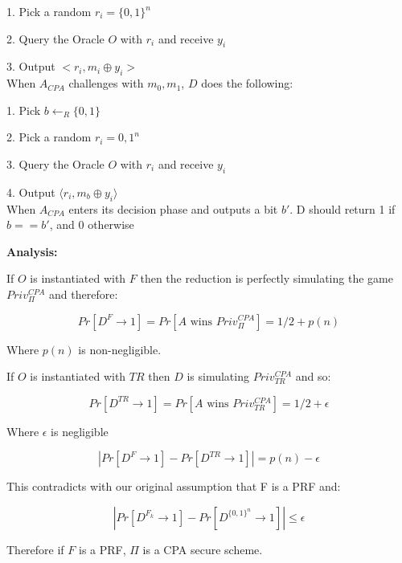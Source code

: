 \documentclass[11pt]{article}
\begin{document}
	\hspace{\parindent} 1. Pick a random $r_i = \{0,1\}^n$
	
	\hspace{\parindent} 2. Query the Oracle $O$ with $r_i$ and receive $y_i$
		
	\hspace{\parindent} 3. Output $<r_i, m_i \oplus y_i>$\\

	\hspace{\parindent} When $A_{CPA}$ challenges with $m_0, m_1$, $D$ does the following:
	
	\hspace{\parindent} 1. Pick $b\gets_R \{0,1\}$ 
	
	\hspace{\parindent} 2. Pick a random $r_i = {0,1}^n$
	
	\hspace{\parindent} 3. Query the Oracle $O$ with $r_i$ and receive $y_i$
	
	\hspace{\parindent} 4.  Output $\langle r_i, m_b \oplus y_i \rangle$\\
	
	\hspace{\parindent} When $A_{CPA}$ enters its decision phase and outputs a bit $b'$. D should return 1 if $b==b'$, and 0 otherwise


\textbf{Analysis:}

If $O$ is instantiated with $F$ then the reduction is perfectly simulating the game $Priv^{CPA}_\Pi$ and therefore:

$$Pr[D^F \rightarrow 1] = Pr[A \textrm{ wins } Priv^{CPA}_\Pi] = 1/2 + p(n)$$

Where $p(n)$ is non-negligible.


If $O$ is instantiated with $TR$ then $D$ is simulating $Priv^{CPA}_{TR}$ and so:

$$Pr[D^{TR} \rightarrow 1] = Pr[A \textrm{ wins } Priv^{CPA}_{TR}] = 1/2 + \epsilon$$

Where $\epsilon$ is negligible

$$|Pr[D^F \rightarrow 1]-Pr[D^{TR} \rightarrow 1]| = p(n) - \epsilon$$

This contradicts with our original assumption that F is a PRF and:

$$|Pr[D^{F_k}\rightarrow 1] - Pr[D^{\{0,1\}^n}\rightarrow1]| \leq \epsilon$$


Therefore if $F$ is a PRF, $\Pi$ is a CPA secure scheme.
\end{document}
